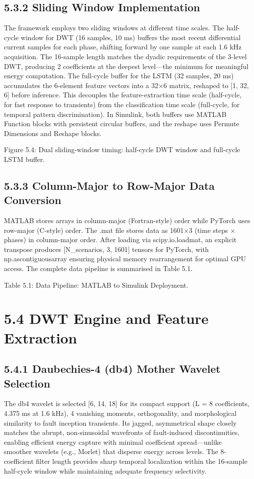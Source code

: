 \subsection{5.3.2  Sliding Window Implementation}
The framework employs two sliding windows at different time scales. The half-cycle window for DWT (16 samples, 10 ms) buffers the most recent differential current samples for each phase, shifting forward by one sample at each 1.6 kHz acquisition. The 16-sample length matches the dyadic requirements of the 3-level DWT, producing 2 coefficients at the deepest level---the minimum for meaningful energy computation. The full-cycle buffer for the LSTM (32 samples, 20 ms) accumulates the 6-element feature vectors into a 32×6 matrix, reshaped to [1, 32, 6] before inference. This decouples the feature-extraction time scale (half-cycle, for fast response to transients) from the classification time scale (full-cycle, for temporal pattern discrimination). In Simulink, both buffers use MATLAB Function blocks with persistent circular buffers, and the reshape uses Permute Dimensions and Reshape blocks.

Figure 5.4: Dual sliding-window timing: half-cycle DWT window and full-cycle LSTM buffer.


\subsection{5.3.3  Column-Major to Row-Major Data Conversion}
MATLAB stores arrays in column-major (Fortran-style) order while PyTorch uses row-major (C-style) order. The .mat file stores data as 1601×3 (time steps × phases) in column-major order. After loading via scipy.io.loadmat, an explicit transpose produces [N\_scenarios, 3, 1601] tensors for PyTorch, with np.ascontiguousarray ensuring physical memory rearrangement for optimal GPU access. The complete data pipeline is summarised in Table 5.1.

Table 5.1: Data Pipeline: MATLAB to Simulink Deployment.


\section{5.4  DWT Engine and Feature Extraction}

\subsection{5.4.1  Daubechies-4 (db4) Mother Wavelet Selection}
The db4 wavelet is selected [6, 14, 18] for its compact support (L = 8 coefficients, 4.375 ms at 1.6 kHz), 4 vanishing moments, orthogonality, and morphological similarity to fault inception transients. Its jagged, asymmetrical shape closely matches the abrupt, non-sinusoidal wavefronts of fault-induced discontinuities, enabling efficient energy capture with minimal coefficient spread---unlike smoother wavelets (e.g., Morlet) that disperse energy across levels. The 8-coefficient filter length provides sharp temporal localization within the 16-sample half-cycle window while maintaining adequate frequency selectivity.


